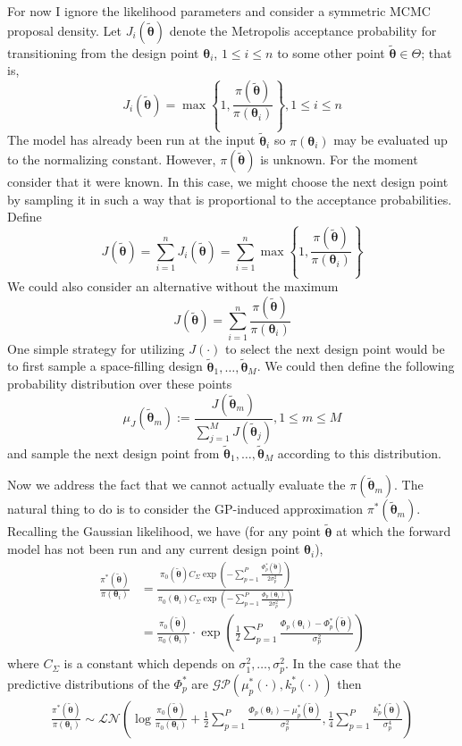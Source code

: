 \documentclass[12pt]{article}
\newcommand{\btheta}{\boldsymbol{\theta}}
\begin{document}
For now I ignore the likelihood parameters and consider a symmetric MCMC proposal density. Let $J_i(\tilde{\btheta})$ denote the Metropolis acceptance probability for transitioning 
from the design point $\btheta_i$, $1 \leq i \leq n$ to some other point $\tilde{\btheta} \in \Theta$; that is, 
\[J_i(\tilde{\btheta}) = \max\left\{1, \frac{\pi(\tilde{\btheta})}{\pi(\btheta_i)} \right\}, 1 \leq i \leq n \]
The model has already been run at the input $\tilde{\btheta}_i$ so $\pi(\btheta_i)$ may be evaluated up to the normalizing constant. However, $\pi(\tilde{\btheta})$ is unknown. For the moment 
consider that it were known. In this case, we might choose the next design point by sampling it in such a way that is proportional to the acceptance probabilities. Define 
\[J(\tilde{\btheta}) = \sum_{i = 1}^{n} J_i(\tilde{\btheta}) = \sum_{i = 1}^{n} \max\left\{1, \frac{\pi(\tilde{\btheta})}{\pi(\btheta_i)} \right\} \]
We could also consider an alternative without the maximum
\[J(\tilde{\btheta}) = \sum_{i = 1}^{n} \frac{\pi(\tilde{\btheta})}{\pi(\btheta_i)}\]
One simple strategy for utilizing $J(\cdot)$ to select the next design point would be to first sample a space-filling design $\tilde{\btheta}_1, \dots, \tilde{\btheta}_M$. We could then define the following
probability distribution over these points
\[\mu_J(\tilde{\btheta}_m) := \frac{J(\tilde{\btheta}_m)}{\sum_{j = 1}^{M} J(\tilde{\btheta}_j)}, 1 \leq m \leq M\]
and sample the next design point from $\tilde{\btheta}_1, \dots, \tilde{\btheta}_M$ according to this distribution. 

Now we address the fact that we cannot actually evaluate the $\pi(\tilde{\btheta}_m)$. The natural thing to do is to consider the GP-induced approximation $\pi^*(\tilde{\btheta}_m)$. Recalling the 
Gaussian likelihood, we have (for any point $\tilde{\btheta}$ at which the forward model has not been run and any current design point $\btheta_i$),
\begin{align*}
\frac{\pi^*(\tilde{\btheta})}{\pi(\btheta_i)} &= \frac{\pi_0(\tilde{\btheta}) C_\Sigma \exp\left(-\sum_{p = 1}^{P} \frac{\Phi_p^*(\tilde{\btheta})}{2\sigma_p^2} \right)}{\pi_0(\btheta_i)C_\Sigma \exp\left(- \sum_{p = 1}^{P} \frac{\Phi_p(\btheta_i)}{2\sigma_p^2} \right)} \\
							    &= \frac{\pi_0(\tilde{\btheta})}{\pi_0(\btheta_i)} \cdot \exp\left(\frac{1}{2} \sum_{p = 1}^{P} \frac{\Phi_p(\btheta_i) - \Phi_p^*(\tilde{\btheta})}{\sigma_p^2} \right)
\end{align*}
where $C_\Sigma$ is a constant which depends on $\sigma_1^2, \dots, \sigma_p^2$. In the case that the predictive distributions of the $\Phi^*_p$ are $\mathcal{GP}(\mu^*_p(\cdot), k_p^*(\cdot))$ then 
\begin{align*}
\frac{\pi^*(\tilde{\btheta})}{\pi(\btheta_i)} \sim \mathcal{LN}\left(\log\frac{\pi_0(\tilde{\btheta})}{\pi_0(\btheta_i)} + \frac{1}{2} \sum_{p = 1}^{P} \frac{\Phi_p(\btheta_i) - \mu_p^*(\tilde{\btheta})}{\sigma_p^2}, \frac{1}{4} \sum_{p = 1}^{P} \frac{k_p^*(\tilde{\btheta})}{\sigma_p^4} \right)
\end{align*}
\end{document}
